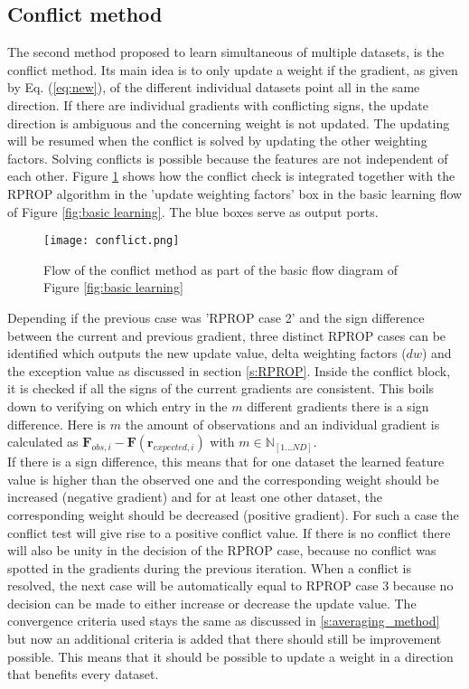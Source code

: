 \subsection{Conflict method}\label{s:conflict_method}
 The second method proposed to learn simultaneous of multiple datasets, is the conflict method. Its main idea is to only update a weight if the gradient, as given by Eq. (\ref{eq:new}), of the different individual datasets point all in the same direction. If there are individual gradients with conflicting signs, the update direction is ambiguous and the concerning weight is not updated. The updating will be resumed when the conflict is solved by updating the other weighting factors. Solving conflicts is possible because the features are not independent of each other. Figure \ref{fig:conflict} shows how the conflict check is integrated together with the RPROP algorithm in the 'update weighting factors' box in the basic learning flow of Figure \ref{fig:basic learning}. The blue boxes serve as output ports.\\
 
  \begin{figure}[h!]
 	\centering
 	\texttt{[image: conflict.png]}
 	\caption{Flow of the conflict method as part of the basic flow diagram of Figure \ref{fig:basic learning}}
 	\label{fig:conflict}
 \end{figure}

Depending if the previous case was 'RPROP case 2' and the sign difference between the current and previous gradient, three distinct RPROP cases can be identified which outputs the new update value, delta weighting factors ($dw$) and the exception value as discussed in section \ref{s:RPROP}. Inside the conflict block, it is checked if all the signs of the current gradients are consistent. This boils down to verifying on which entry in the $m$ different gradients there is a sign difference. Here is $m$ the amount of observations and an individual gradient is calculated as  $\bm{F}_{obs,i} - \bm{F}(\bm{r}_{expected,i})$ with $m \in \mathbb{N}_{[1\dots ND]}$. \\ 

If there is a sign difference, this means that for one dataset the learned feature value is higher than the observed one and the corresponding weight should be increased (negative gradient) and for at least one other dataset, the corresponding weight should be decreased (positive gradient). For such a case the conflict test will give rise to a positive conflict value. If there is no conflict there will also be unity in the decision of the RPROP case, because no conflict was spotted in the gradients during the previous iteration. When a conflict is resolved, the next case will be automatically equal to RPROP case 3 because no decision can be made to either increase or decrease the update value. The convergence criteria used stays the same as discussed in \ref{s:averaging_method} but now an additional criteria is added that there should still be improvement possible. This means that it should be possible to update a weight in a direction that benefits every dataset.\\

